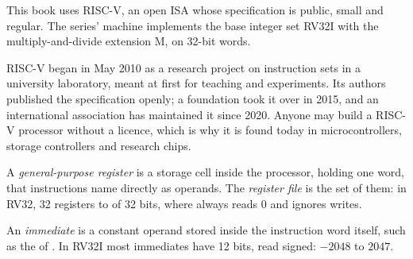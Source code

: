 This book uses RISC-V, an open ISA whose specification is public, small and regular. The series' machine
 implements the base integer set RV32I with the multiply-and-divide extension M, on 32-bit words.

\begin{history}
RISC-V began in May 2010 as a research project on instruction sets in a university laboratory, meant at first for
teaching and experiments. Its authors published the specification openly; a foundation took it over in 2015, and an
international association has maintained it since 2020. Anyone may build a RISC-V processor without a licence, which
is why it is found today in microcontrollers, storage controllers and research chips.
\end{history}

\begin{definition}\label{def:b2:assembly-and-calling-convention:register}
A \emph{general-purpose register} is a storage cell inside the processor, holding one
word, that instructions name directly as operands. The \emph{register file} is the set of them:
in RV32, 32 registers  to  of 32 bits, where  always reads 0 and ignores writes.
\end{definition}

\begin{definition}[Immediate]\label{def:b2:assembly-and-calling-convention:immediate}
An \emph{immediate} is a constant operand stored inside the instruction word itself, such as the
 of . In RV32I most immediates have 12 bits, read signed: $-2048$ to $2047$.
\end{definition}

